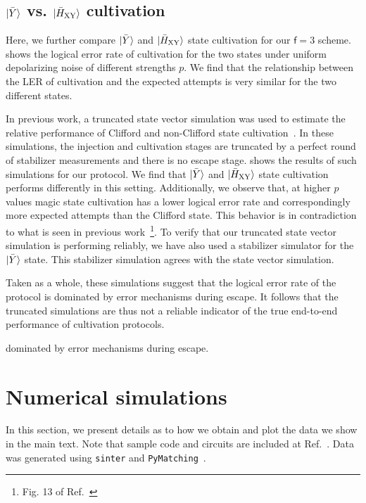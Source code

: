 \documentclass[%
    aps, 
    physrev,
    reprint,
]{revtex4-2}
\newcommand{\fd}[1]{\mathsf{f}=#1}
\newcommand{\XY}{_\mathrm{XY}}
\begin{document}
\subsection{{\texorpdfstring{$\ket{\bar{Y}}$}{Y} vs. \texorpdfstring{$\ket{\bar{H}\XY}$}{H} cultivation}}\label{sec:handoff-results}

Here, we further compare $\ket{\bar{Y}}$ and $\ket{\bar{H}\XY}$ state cultivation for our $\fd3$ scheme.
 shows the logical error rate of cultivation for the two states under uniform depolarizing noise of different strengths $p$.
We find that the relationship between the LER of cultivation and the expected attempts is very similar for the two different states.

In previous work, a truncated state vector simulation was used to estimate the relative performance of Clifford and non-Clifford state cultivation~\cite{gidney2024magic}.
In these simulations, the injection and cultivation stages are truncated by a perfect round of stabilizer measurements and there is no escape stage.
 shows the results of such simulations for our protocol.
We find that $\ket{\bar{Y}}$ and $\ket{\bar{H}\XY}$ state cultivation performs differently in this setting. 
Additionally, we observe that, at higher $p$ values magic state cultivation has a lower logical error rate and correspondingly more expected attempts than the Clifford state. 
This behavior is in contradiction to what is seen in previous work~\footnote{Fig. 13 of Ref.~\cite{gidney2024magic}}.
To verify that our truncated state vector simulation is performing reliably, we have also used a stabilizer simulator for the $\ket{\bar{Y}}$ state. 
This stabilizer simulation agrees with the state vector simulation.

Taken as a whole, these simulations suggest that the logical error rate of the protocol is dominated by error mechanisms during escape. 
It follows that the truncated simulations are thus not a reliable indicator of the true end-to-end performance of cultivation protocols.

dominated by error mechanisms during escape.

\section{Numerical simulations}\label{app:sims}

In this section, we present details as to how we obtain and plot the data we show in the main text. 
Note that sample code and circuits are included at Ref.~\cite{gitrepo}. 
Data was generated using \texttt{sinter} and \texttt{PyMatching}~\cite{sparse25higgott, gidney_sinter}.
\end{document}
